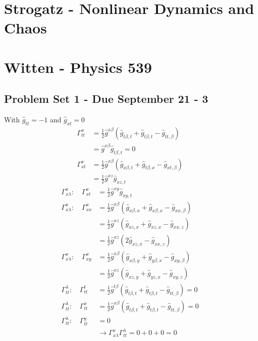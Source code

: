 \documentclass[10pt,a4paper]{book}
\theoremstyle{definition}
\begin{document}
\section{{\sc Strogatz} - Nonlinear Dynamics and Chaos}

\section{{\sc Witten} - Physics 539}
\subsection{Problem Set 1 - Due September 21 - 3}
With $\hat{g}_{tt}=-1$ and $\hat{g}_{xt}=0$
\begin{align}
\Gamma^x_{tt}&=\frac{1}{2}\hat{g}^{x\beta}(\hat{g}_{t\beta,t}+\hat{g}_{t\beta,t}-\hat{g}_{tt,\beta})\\
&=\hat{g}^{x\beta}\hat{g}_{t\beta,t}=0\\
\Gamma^x_{xt}&=\frac{1}{2}\hat{g}^{x\beta}(\hat{g}_{x\beta,t}+\hat{g}_{t\beta,x}-\hat{g}_{xt,\beta})\\
&=\frac{1}{2}\hat{g}^{xz}\hat{g}_{xz,t}
\end{align}
\begin{align}
\Gamma^x_{x\lambda}:\quad\Gamma^x_{xt}&=\frac{1}{2}\hat{g}^{xy}\hat{g}_{xy,t}\\
\Gamma^x_{x\lambda}:\quad\Gamma^x_{xx}&=\frac{1}{2}\hat{g}^{x\beta}(\hat{g}_{x\beta,x}+\hat{g}_{x\beta,x}-\hat{g}_{xx,\beta})\\
&=\frac{1}{2}\hat{g}^{xz}(\hat{g}_{xz,x}+\hat{g}_{xz,x}-\hat{g}_{xx,z})\\
&=\frac{1}{2}\hat{g}^{xz}(2\hat{g}_{xz,x}-\hat{g}_{xx,z})\\
\Gamma^x_{x\lambda}:\quad\Gamma^x_{xy}
&=\frac{1}{2}\hat{g}^{x\beta}(\hat{g}_{x\beta,y}+\hat{g}_{y\beta,x}-\hat{g}_{xy,\beta})\\
&=\frac{1}{2}\hat{g}^{xz}(\hat{g}_{xz,y}+\hat{g}_{yz,x}-\hat{g}_{xy,z})\\
\Gamma^\lambda_{tt}:\quad\Gamma^t_{tt}
&=\frac{1}{2}\hat{g}^{t\beta}(\hat{g}_{t\beta,t}+\hat{g}_{t\beta,t}-\hat{g}_{tt,\beta})=0\\
\Gamma^\lambda_{tt}:\quad\Gamma^x_{tt}
&=\frac{1}{2}\hat{g}^{x\beta}(\hat{g}_{t\beta,t}+\hat{g}_{t\beta,t}-\hat{g}_{tt,\beta})=0\\
\Gamma^\lambda_{tt}:\quad\Gamma^y_{tt}&=0\\
&\rightarrow \Gamma^x_{x\lambda}\Gamma^\lambda_{tt}=0+0+0=0
\end{align}
\end{document}
